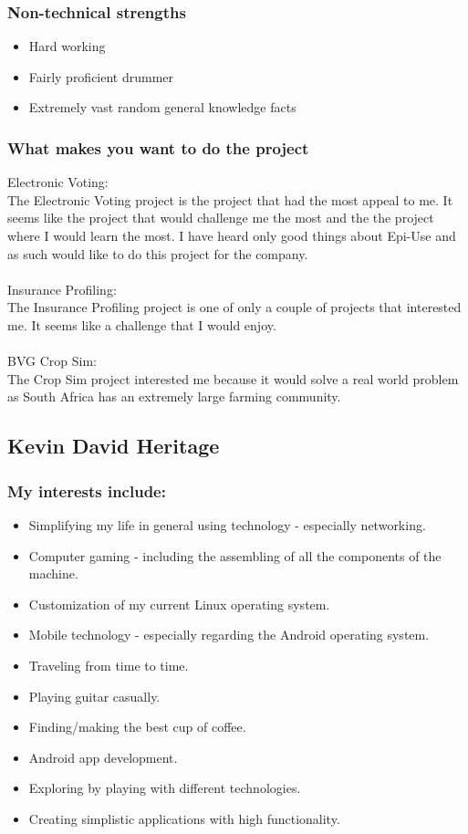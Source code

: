 \documentclass{article}
\begin{document}
	\subsubsection{Non-technical strengths}
	\begin{itemize}
		\item Hard working
		\item Fairly proficient drummer
		\item Extremely vast random general knowledge facts
	\end{itemize}
	\subsubsection{What makes you want to do the project}
	Electronic Voting: \\
	The Electronic Voting project is the project that had the most appeal to me. It seems like the project that would challenge me the most and the the project where I would learn the most. I have heard only good things about Epi-Use and as such would like to do this project for the company. \\
	\\	
	Insurance Profiling: \\
	The Insurance Profiling project is one of only a couple of projects that interested me. It seems like a challenge that I would enjoy. \\
	\\
	BVG Crop Sim: \\
	The Crop Sim project interested me because it would solve a real world problem as South Africa has an extremely large farming community.
	\subsection{Kevin David Heritage}
	\subsubsection{My interests include: }
	\begin{itemize}
		\item Simplifying my life in general using technology - especially networking.
		\item Computer gaming - including the assembling of all the components of the machine.
		\item Customization of my current Linux operating system.
		\item Mobile technology - especially regarding the Android operating system.
		\item Traveling from time to time.
		\item Playing guitar casually.
		\item Finding/making the best cup of coffee.
		\item Android app development.
		\item Exploring by playing with different technologies.
		\item Creating simplistic applications with high functionality.
	\end{itemize}
\end{document}
